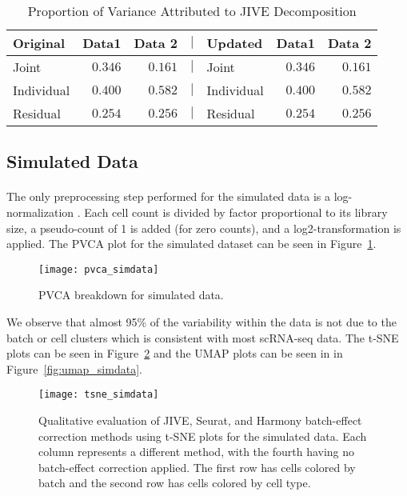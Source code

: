 \documentclass[
12pt, %
letterpaper, %
oneside, %
headinclude,footinclude, %
BCOR5mm, %
]{scrartcl}
\begin{document}
\begin{table}[ht]
    \caption{Proportion of Variance Attributed to JIVE Decomposition}
    \centering
    \begin{tabular}{lrrclrr}
        \toprule
        Original   & Data1 & Data 2    & $\mid$ & Updated    & Data1 & Data 2 \\
        \midrule
        Joint      & $0.346$ & $0.161$ & $\mid$ & Joint      & $0.346$ & $0.161$ \\
        Individual & $0.400$ & $0.582$ & $\mid$ & Individual & $0.400$ & $0.582$ \\
        Residual   & $0.254$ & $0.256$ & $\mid$ & Residual   & $0.254$ & $0.256$ \\
        \bottomrule
        \end{tabular}
    \label{tab:simdata2_variance}
\end{table}


\subsection{Simulated Data}

\paragraph*{}
The only preprocessing step performed for the simulated data is a log-normalization \citep{davis2017scater}. Each cell count is divided by factor proportional to its library size, a pseudo-count of 1 is added (for zero counts), and a log2-transformation is applied. The PVCA plot for the simulated dataset can be seen in Figure~\ref{fig:pvca_simdata}.

\begin{figure}[H]
    \centering 
    \texttt{[image: pvca\_simdata]} 
    \caption[PVCA Breakdown for Simulated Data]{PVCA breakdown for simulated data.}
    \label{fig:pvca_simdata} 
\end{figure}

We observe that almost 95\% of the variability within the data is not due to the batch or cell clusters which is consistent with most scRNA-seq data. The t-SNE plots can be seen in Figure~\ref{fig:tsne_simdata} and the UMAP plots can be seen in in Figure~\ref{fig:umap_simdata}.

\begin{figure}[H]
    \centering 
    \texttt{[image: tsne\_simdata]} 
    \caption[t-SNE Plots for Simulated Data]{Qualitative evaluation of JIVE, Seurat, and Harmony batch-effect correction methods using t-SNE plots for the simulated data. Each column represents a different method, with the fourth having no batch-effect correction applied. The first row has cells colored by batch and the second row has cells colored by cell type.}
    \label{fig:tsne_simdata}
\end{figure}
\end{document}
